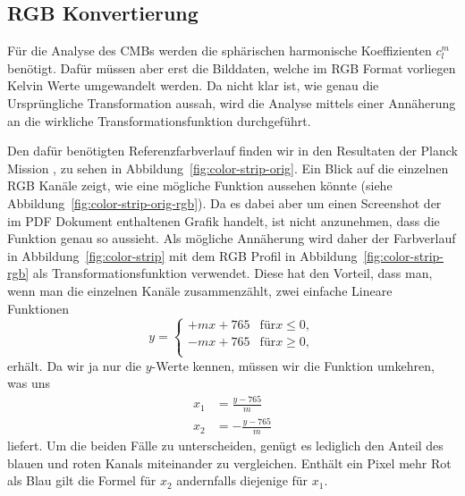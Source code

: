 \subsection{RGB Konvertierung}

Für die Analyse des CMBs werden die sphärischen harmonische Koeffizienten 
$c_l^m$ benötigt. Dafür müssen aber erst die Bilddaten, welche im RGB Format 
vorliegen Kelvin Werte umgewandelt werden. Da nicht klar ist, wie genau die 
Ursprüngliche Transformation aussah, wird die Analyse mittels einer Annäherung 
an die wirkliche Transformationsfunktion durchgeführt.

Den dafür benötigten Referenzfarbverlauf finden wir in den Resultaten der 
Planck Mission \cite{planck_overview}, zu sehen in 
Abbildung~\ref{fig:color-strip-orig}. Ein Blick auf die einzelnen RGB Kanäle 
zeigt, wie eine mögliche Funktion aussehen könnte (siehe 
Abbildung~\ref{fig:color-strip-orig-rgb}). Da es dabei aber um einen Screenshot 
der im PDF Dokument enthaltenen Grafik handelt, ist nicht anzunehmen, dass die 
Funktion genau so aussieht. Als mögliche Annäherung wird daher der Farbverlauf 
in Abbildung~\ref{fig:color-strip} mit dem RGB Profil in 
Abbildung~\ref{fig:color-strip-rgb} als Transformationsfunktion verwendet. 
Diese hat den Vorteil, dass man, wenn man die einzelnen Kanäle zusammenzählt, 
zwei einfache Lineare Funktionen
\begin{equation*}
	y =
	\begin{cases}
		+mx + 765 & \text{für} x \leq 0,\\
		-mx + 765 & \text{für} x \geq 0,\\
	\end{cases}
\end{equation*}
erhält. Da wir ja nur die $y$-Werte kennen, müssen wir die Funktion umkehren, 
was uns
\begin{align*}
	x_1 &= \frac{y - 765}{m}\\
	x_2 &= -\frac{y - 765}{m}
\end{align*}
liefert. Um die beiden Fälle zu unterscheiden, genügt es lediglich den Anteil 
des blauen und roten Kanals miteinander zu vergleichen. Enthält ein Pixel mehr 
Rot als Blau gilt die Formel für $x_2$ andernfalls diejenige für $x_1$.

